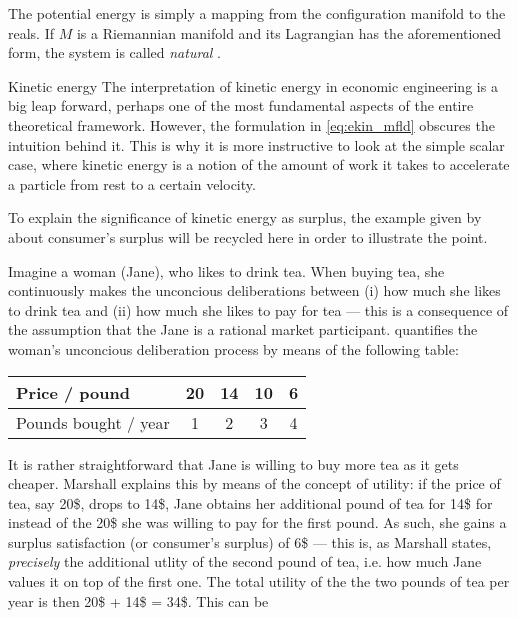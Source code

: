 The potential energy is simply a mapping from the configuration manifold to the reals. If \(M\) is a Riemannian manifold and its Lagrangian has the aforementioned form, the system is called \emph{natural} \cite{Arnold1989}.

\begin{econ}{Kinetic energy}
    The interpretation of kinetic energy in economic engineering is a big leap forward, perhaps one of the most fundamental aspects of the entire theoretical framework. However, the formulation in \cref{eq:ekin_mfld} obscures the intuition behind it. This is why it is more instructive to look at the simple scalar case, where kinetic energy is a notion of the amount of work it takes to accelerate a particle from rest to a certain velocity.

    To explain the significance of kinetic energy as surplus, the example given by \citet[chap.~6]{Marshall1920} about consumer's surplus will be recycled here in order to illustrate the point.

    Imagine a woman (Jane), who likes to drink tea. When buying tea, she continuously makes the unconcious deliberations between (i) how much she likes to drink tea and (ii) how much she likes to pay for tea --- this is a consequence of the assumption that the Jane is a rational market participant. \citeauthor{Marshall1920} quantifies the woman's unconcious deliberation process by means of the following table:
    \begin{center}
        \begin{tabular}{lcccc}
            Price / pound & 20 & 14 & 10 & 6 \\
            \midrule
            Pounds bought / year & 1 & 2 & 3 & 4 \\
        \end{tabular}
    \end{center}
    It is rather straightforward that Jane is willing to buy more tea as it gets cheaper. Marshall explains this by means of the concept of utility: if the price of tea, say 20\$, drops to 14\$, Jane obtains her additional pound of tea for 14\$ for instead of the 20\$ she was willing to pay for the first pound. As such, she gains a surplus satisfaction (or consumer's surplus) of 6\$ --- this is, as Marshall states, \emph{precisely} the additional utlity of the second pound of tea, i.e. how much Jane values it on top of the first one. The total utility of the the two pounds of tea per year is then 20\$ +  14\$ = 34\$. This can be 

\end{econ}

